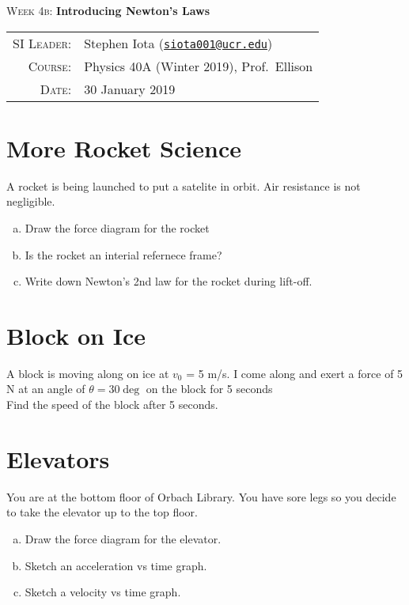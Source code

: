 \documentclass[12pt]{article}
\newcommand{\email}[1]{\texttt{\href{mailto:#1}{#1}}}
\begin{document}
\begin{center}

\Large{\textsc{Week 4b}: \textbf{Introducing Newton's Laws}}

\end{center}

\vspace{.5mm}



\begin{tabular}{rl}
\textsc{SI Leader}:
&
Stephen Iota (\email{siota001@ucr.edu})
\\
\textsc{Course}:
&
Physics 40A (Winter 2019), Prof.~Ellison
\\
\textsc{Date}:
&
30 January 2019
\end{tabular}


\section{More Rocket Science}

A rocket is being launched to put a satelite in orbit. Air resistance is not negligible.

\begin{enumerate}[(a)]
	\item Draw the force diagram for the rocket
	\item Is the rocket an interial refernece frame?
	\item Write down Newton's 2nd law for the rocket during lift-off.
\end{enumerate}


\section{Block on Ice}

A block is moving along on ice at $v_{0}$ = 5 m/s.
I come along and exert a force of 5 N at an angle of $\theta = 30\deg$ on the block for 5 seconds\\
Find the speed of the block after 5 seconds. 


\section{Elevators}

You are at the bottom floor of Orbach Library. You have sore legs so you decide to take the elevator up to the top floor. 

\begin{enumerate}[(a)]
	\item Draw the force diagram for the elevator.
	\item Sketch an acceleration vs time graph.
	\item Sketch a velocity vs time graph.
\end{enumerate}
\end{document}
